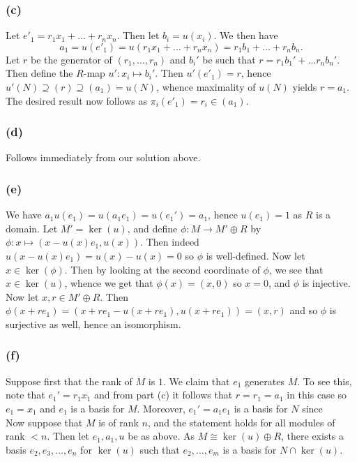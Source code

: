 \documentclass{article}
\theoremstyle{definition}
\begin{document}
\subsubsection*{(c)}

Let $e'_1 = r_1x_1 + \ldots + r_n x_n$. Then let $b_i = u(x_i)$. We then have 
\[
	a_1
	=
	u(e'_1)
	=
	u(r_1x_1 + \ldots + r_n x_n)
	=
	r_1 b_1 + \ldots + r_n b_n.
\] 
Let $r$ be the generator of $(r_1, \ldots, r_n)$ and $b_i'$ be such that $r =
r_1 b_1' + \ldots r_n b_n'$. Then define the $R$-map $u' : x_i \mapsto b_i'$.
Then $u'(e'_1) = r$, hence $u'(N) \supseteq (r) \supseteq (a_1) = u(N)$, whence
maximality of $u(N)$ yields $r = a_1$. The desired result now follows as
$\pi_i(e'_1) = r_i \in (a_1)$.

\subsubsection*{(d)}

Follows immediately from our solution above.

\subsubsection*{(e)}

We have $a_1 u(e_1) = u(a_1e_1) = u(e_1') = a_1$, hence $u(e_1) = 1$ as $R$ is
a domain. Let $M' = \ker(u)$, and define $\phi : M \to M' \oplus R$ by $\phi :
x \mapsto (x - u(x)e_1, u(x))$. Then indeed $u(x - u(x)e_1) = u(x) - u(x) = 0$
so $\phi$ is well-defined. Now let $x \in \ker(\phi)$. Then by looking at the
second coordinate of $\phi$, we see that $x \in \ker(u)$, whence we get that
$\phi(x) = (x, 0)$ so $x = 0$, and $\phi$ is injective. Now let $x, r \in M'
\oplus R$. Then $\phi(x + re_1) = (x + re_1 - u(x + re_1), u(x + re_1)) = (x,
r)$ and so $\phi$ is surjective as well, hence an isomorphism.

\subsubsection*{(f)}

Suppose first that the rank of $M$ is $1$. We claim that $e_1$ generates $M$.
To see this, note that $e_1' = r_1x_1$ and from part (c) it follows that $r =
r_1 = a_1$ in this case so $e_1 = x_1$ and $e_1$ is a basis for $M$. Moreover,
$e_1' = a_1e_1$ is a basis for $N$ since \\

Now suppose that $M$ is of rank $n$, and the statement holds for all modules of
rank $< n$. Then let $e_1, a_1, u$ be as above. As $M \cong \ker(u) \oplus R$,
there exists a basis $e_2, e_3, \ldots, e_n$ for $\ker(u)$ such that $e_2,
\ldots, e_m$ is a basis for $N \cap \ker(u)$.
\end{document}
